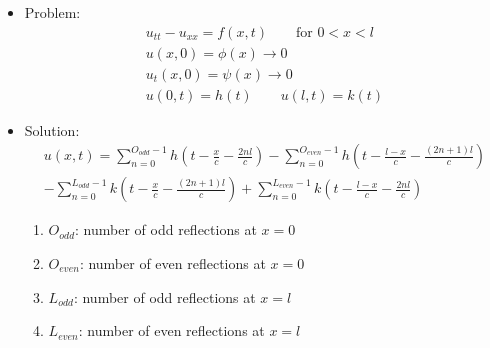 \documentclass[12pt, a4paper]{article}
\begin{document}
\begin{itemize}
    \item Problem:
    \begin{gather*}
        u_{tt} - u_{xx} = f(x, t) \qquad\text{for }0<x<l\\
        u(x, 0) = \phi(x) \rightarrow 0\\
        u_t(x,0) = \psi(x)\rightarrow 0\\
        u(0, t)= h(t) \qquad u(l, t) = k(t)
    \end{gather*}
    \item Solution:
    \begin{gather*}
        u(x, t) = \sum_{n=0}^{O_{odd}-1}h\left(t-\frac{x}{c}-\frac{2nl}{c}\right) - \sum_{n=0}^{O_{even}-1}h\left(t-\frac{l-x}{c}-\frac{(2n+1)l}{c}\right) \\- \sum_{n=0}^{L_{odd}-1}k\left(t-\frac{x}{c}-\frac{(2n+1)l}{c}\right) + \sum_{n=0}^{L_{even}-1}k\left(t-\frac{l-x}{c}-\frac{2nl}{c}\right)
    \end{gather*}

    \begin{enumerate}
        \item $O_{odd}$: number of odd reflections at $x=0$
        \item $O_{even}$: number of even reflections at $x=0$
        \item $L_{odd}$: number of odd reflections at $x=l$
        \item $L_{even}$: number of even reflections at $x=l$
    \end{enumerate}
\end{itemize}
\vspace{0.3em}
\vspace{0.3em}
\end{document}
